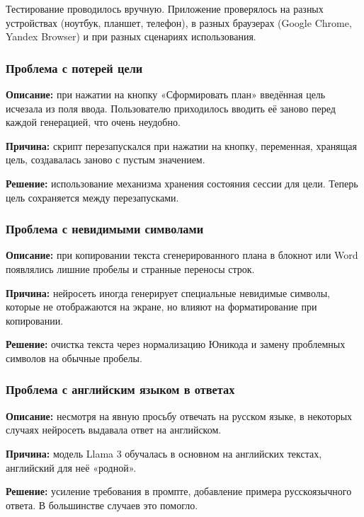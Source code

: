 \documentclass[14pt, a4paper]{extarticle}
\begin{document}
\begin{enumerate}
\noindent Тестирование проводилось вручную. Приложение проверялось на разных устройствах (ноутбук, планшет, телефон), в разных браузерах (Google Chrome, Yandex Browser) и при разных сценариях использования.

\subsubsection{Проблема с потерей цели}

\noindent \textbf{Описание:} при нажатии на кнопку «Сформировать план» введённая цель исчезала из поля ввода. Пользователю приходилось вводить её заново перед каждой генерацией, что очень неудобно.

\medskip
\noindent \textbf{Причина:} скрипт перезапускался при нажатии на кнопку, переменная, хранящая цель, создавалась заново с пустым значением.

\medskip
\noindent \textbf{Решение:} использование механизма хранения состояния сессии для цели. Теперь цель сохраняется между перезапусками.

\subsubsection{Проблема с невидимыми символами}

\noindent \textbf{Описание:} при копировании текста сгенерированного плана в блокнот или Word появлялись лишние пробелы и странные переносы строк.

\medskip
\noindent \textbf{Причина:} нейросеть иногда генерирует специальные невидимые символы, которые не отображаются на экране, но влияют на форматирование при копировании.

\medskip
\noindent \textbf{Решение:} очистка текста через нормализацию Юникода и замену проблемных символов на обычные пробелы.

\subsubsection{Проблема с английским языком в ответах}

\noindent \textbf{Описание:} несмотря на явную просьбу отвечать на русском языке, в некоторых случаях нейросеть выдавала ответ на английском.

\medskip
\noindent \textbf{Причина:} модель Llama 3 обучалась в основном на английских текстах, английский для неё «родной».

\medskip
\noindent \textbf{Решение:} усиление требования в промпте, добавление примера русскоязычного ответа. В большинстве случаев это помогло.
\vskip 5cm

\end{enumerate}
\end{document}
